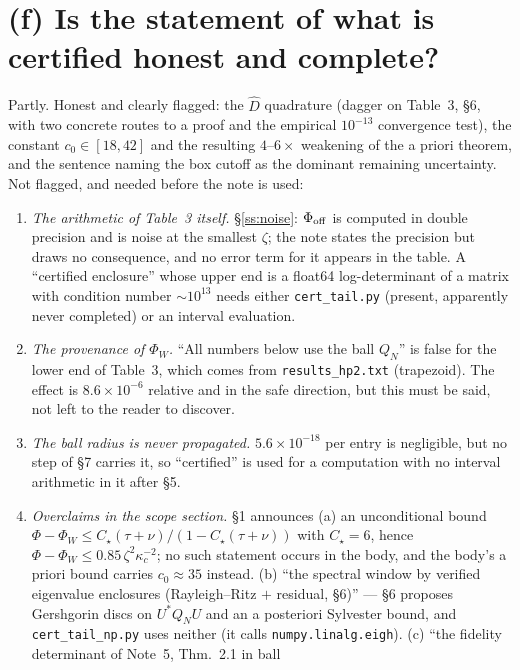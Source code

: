 \documentclass[11pt]{article}
\begin{document}
\small
\section{(f) Is the statement of what is certified honest and complete?}\label{sec:f}

\begin{verdictgap}
Partly.  Honest and clearly flagged: the $\widehat D$ quadrature (dagger on Table~3, \S6, with two
concrete routes to a proof and the empirical $10^{-13}$ convergence test), the constant
$c_0\in[18,42]$ and the resulting $4$--$6\times$ weakening of the a priori theorem, and the
sentence naming the box cutoff as the dominant remaining uncertainty.  Not flagged, and needed
before the note is used:
\begin{enumerate}[label=(\roman*),leftmargin=1.8em]
\item \emph{The arithmetic of Table~3 itself.}  \S\ref{ss:noise}: $\Phi_{\rm off}$ is computed in
 double precision and is noise at the smallest $\zeta$; the note states the precision but draws no
 consequence, and no error term for it appears in the table.  A ``certified enclosure'' whose upper
 end is a float64 log-determinant of a matrix with condition number $\sim10^{13}$ needs either
 \texttt{cert\_tail.py} (present, apparently never completed) or an interval evaluation.
\item \emph{The provenance of $\Phi_W$.}  ``All numbers below use the ball $Q_N$'' is false for the
 lower end of Table~3, which comes from \texttt{results\_hp2.txt} (trapezoid).  The effect is
 $8.6\times10^{-6}$ relative and in the safe direction, but this must be said, not left to the
 reader to discover.
\item \emph{The ball radius is never propagated.}  $5.6\times10^{-18}$ per entry is negligible, but
 no step of \S7 carries it, so ``certified'' is used for a computation with no interval arithmetic
 in it after \S5.
\item \emph{Overclaims in the scope section.}  \S1 announces (a) an unconditional bound
 $\Phi-\Phi_W\le C_\star(\tau+\nu)/(1-C_\star(\tau+\nu))$ with $C_\star=6$, hence
 $\Phi-\Phi_W\le0.85\,\zeta^2\kappa_c^{-2}$; no such statement occurs in the body, and the body's a
 priori bound carries $c_0\approx35$ instead.  (b) ``the spectral window by verified eigenvalue
 enclosures (Rayleigh--Ritz $+$ residual, \S6)'' --- \S6 proposes Gershgorin discs on $U^*Q_NU$ and an
 a posteriori Sylvester bound, and \texttt{cert\_tail\_np.py} uses neither (it calls
 \texttt{numpy.linalg.eigh}).  (c) ``the fidelity determinant of Note~5, Thm.~2.1 in ball

\end{enumerate}
\end{verdictgap}
\end{document}

